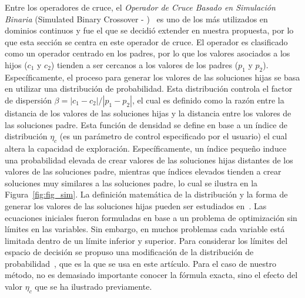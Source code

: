 Entre los operadores de cruce, el \textit{Operador de Cruce Basado en Simulación Binaria} (Simulated Binary Crossover - \SBX{})~\cite{deb1994simulated}
es uno de los más utilizados en dominios continuos y fue el que se decidió extender en nuestra propuesta, por lo que esta sección se centra en este operador de cruce.
%
El operador \SBX{} es clasificado como un operador centrado en los padres, por lo que los valores asociados a los hijos ($c_1$ y $c_2$) 
tienden a ser cercanos a los valores de los padres ($p_1$ y $p_2$).
%
Específicamente, el proceso para generar los valores de las soluciones hijas se basa en utilizar una distribución de probabilidad.
%
Esta distribución controla el factor de dispersión $\beta = |c_1 - c_2 | / |p_1 - p_2|$, el cual es definido como la razón entre la distancia de los valores de las soluciones hijas
y la distancia entre los valores de las soluciones padre.
%
Esta función de densidad se define en base a un índice de distribución $\eta_c$ (es un parámetro de control especificado por el usuario) 
el cual altera la capacidad de exploración.
%
Específicamente, un índice pequeño induce una probabilidad elevada de crear valores de las soluciones hijas distantes de los valores de las 
soluciones padre, mientras que índices elevados tienden a crear soluciones muy similares a las soluciones padre, lo cual se ilustra
en la Figura~\ref{fig:fig_sim}.
%
La definición matemática de la distribución y la forma de generar los valores de las soluciones hijas pueden ser estudiados en~\cite{deb1994simulated}.
%
Las ecuaciones iniciales fueron formuladas en base a un problema de optimización sin límites en las variables.
%
Sin embargo, en muchos problemas cada variable está limitada dentro de un límite inferior y superior.
%
Para considerar los límites del espacio de decisión se propuso una modificación de la distribución de probabilidad~\cite{deb1999self}, 
que es la que se usa en este artículo.
%
Para el caso de nuestro método, no es demasiado importante conocer la fórmula exacta, sino el efecto del valor $\eta_c$ que se ha ilustrado previamente.


%




